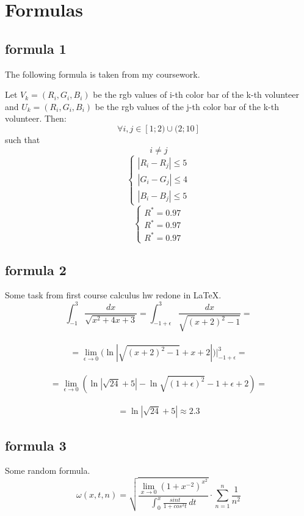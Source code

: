 \documentclass[a4paper, 12pt]{article}
\begin{document}
\newpage



\section{Formulas}

\subsection{formula 1}
The following formula is taken from my coursework.


Let $V_k = (R_i,G_i,B_i)$ be the rgb values of i-th color bar of the k-th volunteer and $U_k = (R_i,G_i,B_i)$ be the rgb values of the j-th  color bar of the k-th volunteer. Then: 
$$\forall i,j\in [1;2) \cup (2;10]$$ such that $$i \neq j$$
\begin{equation*}
 \begin{cases}
  |R_i-R_j|\leq5 \\
  |G_i-G_j|\leq4 \\
  |B_i-B_j|\leq5
 \end{cases}
\end{equation*}
\begin{equation*}
 \begin{cases}
  R^*=0.97 \\
  R^*=0.97 \\
  R^*=0.97
 \end{cases}
\end{equation*}

\subsection{formula 2} %
Some task from first course calculus hw redone in LaTeX.
\newline
\newline
\large
$$\int_{-1}^{3} \frac{dx}{\sqrt{x^2+4x+3}}=\int_{-1+\epsilon}^{3} \frac{dx}{\sqrt{(x+2)^2-1}}=$$\\
$$=\lim_{\epsilon\to 0}(\ln{|\sqrt{(x+2)^2-1}+x+2|)\bigg|_{-1+\epsilon}^{3}}=$$\\
$$=\lim_{\epsilon\to 0}(\ln{|\sqrt{24}+5|}-\ln{\sqrt{(1+\epsilon)^2}-1+\epsilon+2})=$$\\
$$=\ln{|\sqrt{24}+5|}\approx 2.3$$
\normalsize
\subsection{formula 3}
Some random formula.
\LARGE
$$\omega(x,t,n)=\sqrt{\frac{\lim_{x\to 0} (1+x^{-2})^{x^2}}{\int_{0}^{x}\frac{sin t}{1+cos^2 t}\,dt}}\cdot\sum_{n=1}^n\frac{1}{n^2}$$
\normalsize 
\end{document}
